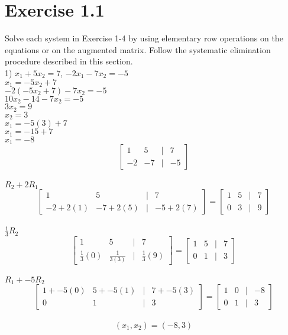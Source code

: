 \documentclass[]{article}
\begin{document}
\section{Exercise 1.1}
Solve each system in Exercise 1-4 by using elementary row operations on the equations or on the augmented matrix. Follow the systematic elimination procedure described in this section.\\

1) $x_1 + 5x_2 = 7$, $-2x_1 - 7x_2 = -5$\\
$x_1 = -5x_2 + 7$\\
$-2(-5x_2 + 7) - 7x_2 = -5$\\
$10x_2 - 14 - 7x_2 = -5$\\
$3x_2 = 9$\\
$x_2 = 3$\\
$x_1 = -5(3) + 7$\\
$x_1 = -15 + 7$\\
$x_1 = -8$\\
\[
\begin{bmatrix}
	1 & 5 & | & 7 \\
	-2 & -7& | & -5
\end{bmatrix}
\]\\
$R_2 + 2R_1$\\
\[
\begin{bmatrix}
	1 & 5 & | & 7 \\
	-2+2(1) & -7+2(5) & | & -5+2(7)
\end{bmatrix}=
\begin{bmatrix}
	1 & 5 & | & 7 \\
	0 & 3 & | & 9
\end{bmatrix}
\]\\
$\frac{1}{3}R_2$\\
\[
\begin{bmatrix}
	1 & 5 & | & 7 \\
	\frac{1}{3}(0) & \frac{1}{3(3)} & | & \frac{1}{3}(9)
\end{bmatrix}=
\begin{bmatrix}
	1 & 5 & | & 7 \\
	0 & 1 & | & 3
\end{bmatrix}
\]\\
$R_1 + -5R_2$\\
\[
\begin{bmatrix}
	1 + -5(0) & 5 + -5(1) & | & 7 + -5(3) \\
	0 & 1 & | & 3
\end{bmatrix}=
\begin{bmatrix}
	1 & 0 & | & -8 \\
	0 & 1 & | & 3
\end{bmatrix}
\]\\
$$(x_1,x_2) = (-8,3)$$\\
\end{document}
